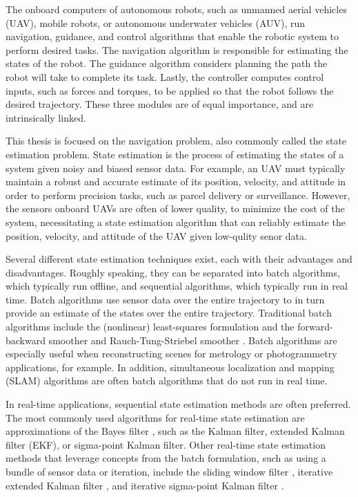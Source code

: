 The onboard computers of autonomous robots, such as unmanned aerial vehicles (UAV), mobile robots, or autonomous underwater vehicles (AUV), run navigation, guidance, and control  algorithms that enable the robotic system to perform desired tasks. The navigation algorithm is responsible for estimating the states of the robot. The guidance algorithm considers planning the path the robot will take to complete its task.  Lastly, the controller computes control inputs, such as forces and torques, to be applied so that the robot follows the desired trajectory. These three modules are of equal importance, and are intrinsically linked. 

This thesis is focused on the navigation problem, also commonly called the state estimation problem. State estimation is the process of estimating the states of a system given noisy and biased sensor data. For example, an UAV must typically maintain a robust and accurate estimate of its position, velocity, and attitude in order to perform precision tasks, such as parcel delivery or surveillance. However, the sensors onboard UAVs are often of lower quality, to minimize the cost of the system, necessitating a state estimation algorithm that can reliably estimate the  position, velocity, and attitude of the UAV given low-qulity senor data.

Several different state estimation techniques exist, each with their advantages and disadvantages. Roughly speaking, they can be separated into batch algorithms, which typically run offline, and sequential algorithms, which typically run in real time. Batch algorithms use sensor data over the entire trajectory to in turn provide an estimate of the states over the entire trajectory. Traditional batch algorithms include the (nonlinear) least-squares formulation \cite[Sec. 4.3]{Barfoot2017} and the forward-backward smoother \cite[Sec. 3.2.2]{Barfoot2017} and Rauch-Tung-Striebel smoother \cite[Sec. 3.2.3]{Barfoot2017}.  Batch algorithms are especially useful when reconstructing scenes for metrology or photogrammetry applications, for example. In addition, simultaneous localization and mapping (SLAM) algorithms are often batch algorithms that do not run in real time. 

In real-time applications, sequential state estimation methods are often preferred.  The most commonly used algorithms for real-time state estimation are approximations of the Bayes filter \cite{Sarkka2010}, such as the Kalman filter, extended Kalman filter (EKF), or sigma-point Kalman filter. Other real-time state estimation methods that leverage concepts from the batch formulation, such as using a bundle of sensor data or iteration, include the sliding window filter \cite{Sibley2006}, iterative extended Kalman filter \cite[Sec. 4.2.5]{Barfoot2017}, and iterative sigma-point Kalman filter \cite[Sec. 4.2.10]{Barfoot2017}.

